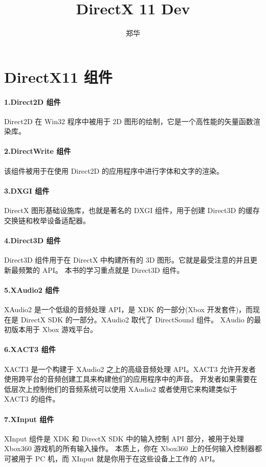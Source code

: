 \documentclass[UTF8,a4paper,8pt]{ctexart}
\author{郑华}
\title{DirectX 11 Dev}
\begin{document}
 
 	\maketitle
 \section{DirectX11 组件}
 
			 \paragraph{1.Direct2D 组件}Direct2D 在 Win32 程序中被用于 2D 图形的绘制，它是一个高性能的矢量函数渲染库。
			 \paragraph{2.DirectWrite 组件}该组件被用于在使用 Direct2D 的应用程序中进行字体和文字的渲染。
			 
			 \paragraph{3.DXGI 组件}DirectX 图形基础设施库，也就是著名的 DXGI 组件，用于创建 Direct3D 的缓存交换链和枚举设备适配器。
			 
			 \paragraph{4.Direct3D 组件}Direct3D 组件用于在 DirectX 中构建所有的 3D 图形。它就是最受注意的并且更新最频繁的 API。 本书的学习重点就是 Direct3D 组件。
			 
			 \paragraph{5.XAudio2 组件}XAudio2 是一个低级的音频处理 API，是 XDK 的一部分(Xbox 开发套件)，而现在是 DirectX SDK 的一部分。XAudio2 取代了 DirectSound 组件。 XAudio 的最初版本用于 Xbox 游戏平台。
			 
			 \paragraph{6.XACT3 组件}XACT3 是一个构建于 XAudio2 之上的高级音频处理 API。XACT3 允许开发者使用跨平台的音频创建工具来构建他们的应用程序中的声音。 开发者如果需要在低层次上控制他们的音频系统可以使用 XAudio2 或者使用它来构建类似于 XACT3 的组件。
			 
			 \paragraph{7.XInput 组件}XInput 组件是 XDK 和 DirectX SDK 中的输入控制 API 部分，被用于处理 Xbox360 游戏机的所有输入操作。 本质上，你在 Xbox360 上的任何输入控制器都可被用于 PC 机，而 XInput 就是你用于在这些设备上工作的 API。
			 
\end{document}
